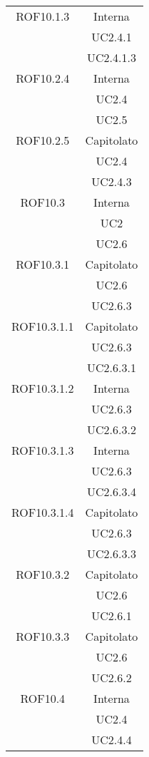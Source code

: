 \begin{longtable}{|c|c|}
\midrule
ROF10.1.3
& Interna\\
& UC2.4.1\\
& UC2.4.1.3\\

\midrule
ROF10.2.4
& Interna\\
& UC2.4\\
& UC2.5\\

\midrule
ROF10.2.5
& Capitolato\\
& UC2.4\\
& UC2.4.3\\

\midrule
ROF10.3
& Interna\\
& UC2\\
& UC2.6\\

\midrule
ROF10.3.1
& Capitolato\\
& UC2.6\\
& UC2.6.3\\

\midrule
ROF10.3.1.1
& Capitolato\\
& UC2.6.3\\
& UC2.6.3.1\\

\midrule
ROF10.3.1.2
& Interna\\
& UC2.6.3\\
& UC2.6.3.2\\

\midrule
ROF10.3.1.3
& Interna\\
& UC2.6.3\\
& UC2.6.3.4\\

\midrule
ROF10.3.1.4
& Capitolato\\
& UC2.6.3\\
& UC2.6.3.3\\

\midrule
ROF10.3.2
& Capitolato\\
& UC2.6\\
& UC2.6.1\\

\midrule
ROF10.3.3
& Capitolato\\
& UC2.6\\
& UC2.6.2\\

\midrule
ROF10.4
& Interna\\
& UC2.4\\
& UC2.4.4\\


\end{longtable}

